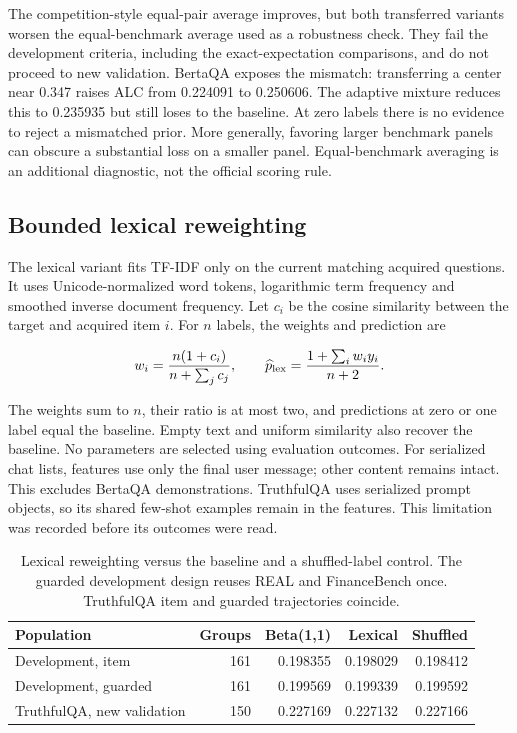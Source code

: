 \documentclass{article}
\begin{document}
The competition-style equal-pair average improves, but both transferred variants worsen the equal-benchmark average used as a robustness check. They fail the development criteria, including the exact-expectation comparisons, and do not proceed to new validation. BertaQA exposes the mismatch: transferring a center near 0.347 raises ALC from 0.224091 to 0.250606. The adaptive mixture reduces this to 0.235935 but still loses to the baseline. At zero labels there is no evidence to reject a mismatched prior. More generally, favoring larger benchmark panels can obscure a substantial loss on a smaller panel. Equal-benchmark averaging is an additional diagnostic, not the official scoring rule.

\subsection{Bounded lexical reweighting}\label{bounded-lexical-reweighting}

The lexical variant fits TF-IDF only on the current matching acquired questions. It uses Unicode-normalized word tokens, logarithmic term frequency and smoothed inverse document frequency. Let \(c_i\) be the cosine similarity between the target and acquired item \(i\). For \(n\) labels, the weights and prediction are

\begin{equation}
w_i=\frac{n(1+c_i)}{n+\sum_j c_j},\qquad
\widehat p_{\rm lex}=\frac{1+\sum_i w_i y_i}{n+2}.
\end{equation}

The weights sum to \(n\), their ratio is at most two, and predictions at zero or one label equal the baseline. Empty text and uniform similarity also recover the baseline. No parameters are selected using evaluation outcomes. For serialized chat lists, features use only the final user message; other content remains intact. This excludes BertaQA demonstrations. TruthfulQA uses serialized prompt objects, so its shared few-shot examples remain in the features. This limitation was recorded before its outcomes were read.

\clearpage
\begin{table}[ht]
\centering
\caption{Lexical reweighting versus the baseline and a shuffled-label control. The guarded development design reuses REAL and FinanceBench once. TruthfulQA item and guarded trajectories coincide.}
\label{tab:retrieval}
\small
\begin{tabular}{lrrrr}
\toprule
Population & Groups & Beta(1,1) & Lexical & Shuffled \\
\midrule
Development, item & 161 & 0.198355 & 0.198029 & 0.198412 \\
Development, guarded & 161 & 0.199569 & 0.199339 & 0.199592 \\
TruthfulQA, new validation & 150 & 0.227169 & 0.227132 & 0.227166 \\
\bottomrule
\end{tabular}
\end{table}
\end{document}
